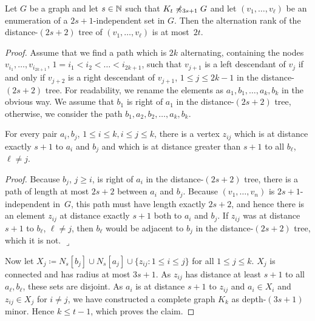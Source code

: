 \begin{lemma}\label{thm:alternation-rank-type-tree}
Let $G$ be a graph and let $s\in \mathbb{N}$ such that $K_t\not\preccurlyeq_{3s+1} G$ and let
$(v_1,\ldots, v_\ell)$ be an enumeration of a $2s+1$-independent set 
in $G$. Then the alternation rank of the distance-$(2s+2)$ tree of 
$(v_1,\ldots, v_\ell)$ is at most~$2t$. 
\end{lemma}
\begin{proof}
Assume that we find a path which is $2k$ alternating, 
containing the nodes $v_{i_1},\ldots, v_{i_{2k+1}}$, $1=i_1<i_2<\ldots <i_{2k+1}$, such that $v_{j+1}$ is a left descendant of $v_j$
if and only if $v_{j+2}$ is a right descendant of $v_{j+1}$, $1\leq j\leq 2k-1$ in
the distance-$(2s+2)$ tree.
For readability, we rename the elements as $a_1,b_1,\ldots, a_k,b_k$ in the 
obvious way. We assume that $b_1$ is right of $a_1$ in the distance-$(2s+2)$ 
tree, otherwise, we consider
the path $b_1,a_2,b_2,\ldots,a_k, b_k$. 

\begin{claim}
For every pair $a_i,b_j$, $1\leq i\leq k, i\leq j\leq k$, there
is a vertex $z_{ij}$ which is at distance exactly $s+1$ to 
$a_i$ and $b_j$ and which is at distance greater than $s+1$ 
to all $b_\ell$, $\ell\neq j$. 
\end{claim}

\noindent\textit{Proof.} 
Because $b_j$, $j\geq i$, is right of $a_i$ in the distance-$(2s+2)$ tree, 
there is a path of length at most $2s+2$ between $a_i$ and $b_j$. 
Because $(v_1,\ldots, v_n)$ is $2s+1$-independent in~$G$, this path
must have length exactly $2s+2$, and hence there is an element $z_{ij}$ 
at distance exactly $s+1$ both to $a_i$ and $b_j$. 
If $z_{ij}$ was at distance $s+1$ to $b_\ell$, $\ell\neq j$, then $b_\ell$ would be adjacent 
to $b_j$ in the distance-$(2s+2)$ tree, which it is not. \hfill$\lrcorner$

\bigskip
Now let $X_j\coloneqq N_s[b_j]\cup N_s[a_j]\cup\{z_{ij} : 1\leq i\leq j\}$
for all $1\leq j\leq k$. $X_j$ is connected and has radius at most $3s+1$. 
As $z_{ij}$ has distance at least $s+1$ to all $a_\ell, b_\ell$, these sets 
are disjoint. 
As $a_i$ is at distance $s+1$ to $z_{ij}$ and 
$a_i\in X_i$ and $z_{ij}\in X_j$ for $i\neq j$, 
we have constructed a complete graph $K_k$ as depth-$(3s+1)$ minor. Hence 
$k\leq t-1$, which proves the claim. 
\end{proof}

%


